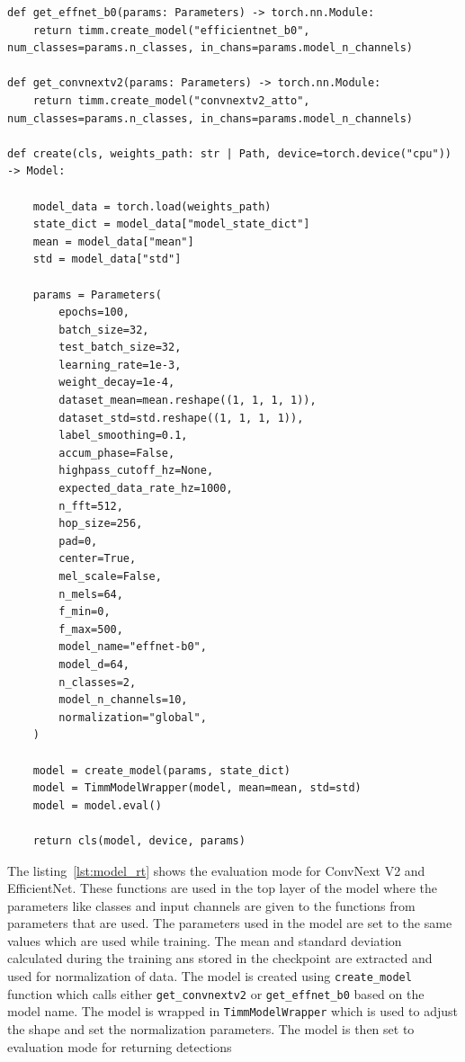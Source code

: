 \begin{lstlisting}[style=pythonstyle, caption={Model evaluation mode in the framework}, label=lst:model_rt]
def get_effnet_b0(params: Parameters) -> torch.nn.Module:
    return timm.create_model("efficientnet_b0", num_classes=params.n_classes, in_chans=params.model_n_channels)

def get_convnextv2(params: Parameters) -> torch.nn.Module:
    return timm.create_model("convnextv2_atto", num_classes=params.n_classes, in_chans=params.model_n_channels)

def create(cls, weights_path: str | Path, device=torch.device("cpu")) -> Model:

    model_data = torch.load(weights_path)
    state_dict = model_data["model_state_dict"]
    mean = model_data["mean"]
    std = model_data["std"]

    params = Parameters(
        epochs=100,
        batch_size=32,
        test_batch_size=32,
        learning_rate=1e-3,
        weight_decay=1e-4,
        dataset_mean=mean.reshape((1, 1, 1, 1)),
        dataset_std=std.reshape((1, 1, 1, 1)),
        label_smoothing=0.1,
        accum_phase=False,
        highpass_cutoff_hz=None,
        expected_data_rate_hz=1000,
        n_fft=512,
        hop_size=256,
        pad=0,
        center=True,
        mel_scale=False,
        n_mels=64,
        f_min=0,
        f_max=500,
        model_name="effnet-b0",
        model_d=64,
        n_classes=2,
        model_n_channels=10,
        normalization="global",
    )

    model = create_model(params, state_dict)
    model = TimmModelWrapper(model, mean=mean, std=std)
    model = model.eval()

    return cls(model, device, params)

\end{lstlisting}

The listing~\ref{lst:model_rt} shows the evaluation mode for ConvNext V2 and EfficientNet. These functions are used in the top layer of the model where the parameters like classes and input channels are given to the functions from parameters that are used. The  parameters used in the model are set to the same values which are used while training. The mean and standard deviation calculated during the training ans stored in the checkpoint are extracted and used for normalization of data. The model is created using \texttt{create\_model} function which calls either \texttt{get\_convnextv2} or \texttt{get\_effnet\_b0} based on the model name. The model is wrapped in \texttt{TimmModelWrapper} which is used to adjust the shape and set the normalization parameters. The model is then set to evaluation mode for returning detections
